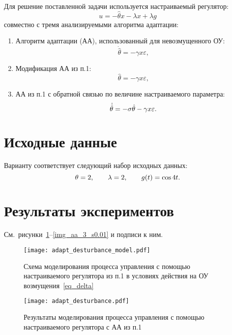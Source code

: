 Для решение поставленной задачи используется настраиваемый регулятор:
\begin{equation}\label{eq_tuned_controller}
    u = -\hat{\theta} x - \lambda x + \lambda g
\end{equation}
совместно с тремя анализируемыми алгоритма адаптации:
\begin{enumerate}
	\item 	Алгоритм адаптации (АА), использованный для невозмущенного ОУ:
	\begin{equation}\label{eq_AA_1}
		\dot{\hat{\theta}} = -\gamma x \varepsilon,
	\end{equation}
	\item Модификация АА из п.1:
	\begin{equation}\label{eq_AA_2}
		{\hat{\theta}} = -\gamma x \varepsilon,
	\end{equation}
	\item АА из п.1 с обратной связью по величине настраиваемого параметра:
	\begin{equation}\label{eq_AA_3}
		\dot{\hat{\theta}} = - \sigma \hat{\theta} -\gamma x \varepsilon \ldotp
	\end{equation}
\end{enumerate}

\section{Исходные данные}
Варианту  соответствует следующий набор исходных данных:
\begin{equation}
    \theta = 2,
    \qquad
    \lambda = 2,
    \qquad
    g(t) = \cos 4t \ldotp
\end{equation}


\section{Результаты экспериментов}
См.~рисунки~\ref{img_first}--\ref{img_aa_3_s0.01} и подписи к ним.

\begin{figure}[h!]
    \centering
    \texttt{[image: adapt\_desturbance\_model.pdf]}
    \caption{Схема моделирования процесса управления с помощью настраиваемого регулятора из п.1 в условиях действия на ОУ возмущения~\ref{eq_delta}}
    \label{img_first}
\end{figure}

\begin{figure}[h!]
    \centering
    \texttt{[image: adapt\_desturbance.pdf]}
    \caption{Результаты моделирования процесса управления с помощью настраиваемого регулятора с АА из п.1}
    \label{img_aa_1}
\end{figure}

